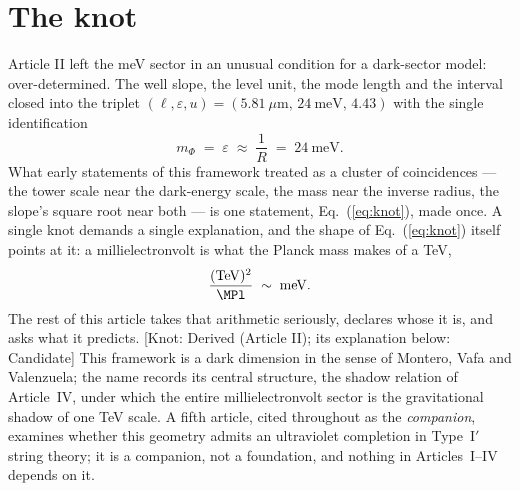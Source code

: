 \begin{abstract}
$\Lambda^{1/4}/\mu=0.093\approx1/4\pi$, so the hierarchy between the dark-energy scale and the sector scale is a loop factor, not a new scale --- below $\MS$ the framework contains no free scale at all. The experimental consequence is a triangle: the torsion balance reads the radion window, which \emph{is} a window on $\MS$ (3.5--9.8~TeV); a next-generation collider reads $\MS$ directly; and LISA reads the transition dynamics at the same scale. Two instruments that have never shared a parameter would be measuring the same number from two ends, with a third to arbitrate. The article ends with the complete map of the framework --- what is derived, what is candidate, what is input and natural, what is measured, what only data can decide, and what is inherited from the cosmological constant --- and with the compiled list of everything that kills it.
\end{abstract}

\section{The knot}
Article II left the meV sector in an unusual condition for a dark-sector model: over-determined. The well slope, the level unit, the mode length and the interval closed into the triplet $(\ell,\varepsilon,u)=(5.81~\mu\mathrm{m},\,24~\mathrm{meV},\,4.43)$ with the single identification
\begin{equation}
m_{\Phi}\;=\;\varepsilon\;\approx\;\frac{1}{R}\;=\;24~\mathrm{meV}.
\label{eq:knot}
\end{equation}
What early statements of this framework treated as a cluster of coincidences --- the tower scale near the dark-energy scale, the mass near the inverse radius, the slope's square root near both --- is one statement, Eq.~(\ref{eq:knot}), made once. A single knot demands a single explanation, and the shape of Eq.~(\ref{eq:knot}) itself points at it: a millielectronvolt is what the Planck mass makes of a TeV,
\begin{equation}
\frac{(\mathrm{TeV})^{2}}{\MPl}\;\sim\;\mathrm{meV}.
\end{equation}
The rest of this article takes that arithmetic seriously, declares whose it is, and asks what it predicts. [Knot: Derived (Article II); its explanation below: Candidate] This framework is a dark dimension in the sense of Montero, Vafa and Valenzuela; the name records its central structure, the shadow relation of Article~IV, under which the entire millielectronvolt sector is the gravitational shadow of one TeV scale. A fifth article, cited throughout as the \emph{companion}, examines whether this geometry admits an ultraviolet completion in Type~I$'$ string theory; it is a companion, not a foundation, and nothing in Articles~I--IV depends on it.

